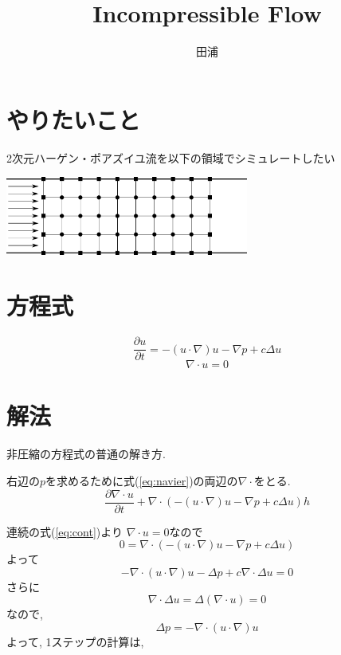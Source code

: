\documentclass[12pt,dvipdfmx]{article}
\title{Incompressible Flow}
\author{田浦}
\date{}
\begin{document}
\maketitle

\section{やりたいこと}
2次元ハーゲン・ポアズイユ流を以下の領域でシミュレートしたい

\begin{center}
\includegraphics[width=0.6\textwidth]{out/pdf/svg/flow.pdf}
\end{center}

\section{方程式}

\begin{equation}
  \frac{\partial u}{\partial t}
  = - (u \cdot \nabla) u - \nabla p + c \Delta u
  \label{eq:navier}
\end{equation}
\begin{equation}
  \nabla \cdot u = 0
  \label{eq:cont}
\end{equation}

\section{解法}
非圧縮の方程式の普通の解き方.

右辺の$p$を求めるために式(\ref{eq:navier})の両辺の$\nabla \cdot$をとる.
\begin{equation}
\frac{\partial \nabla\cdot u}{\partial t}
  + \nabla \cdot (- (u \cdot \nabla) u - \nabla p + c \Delta u) h
\end{equation}

連続の式(\ref{eq:cont})より
$\nabla \cdot u = 0$なので
\begin{equation}
  0 = \nabla \cdot (- (u \cdot \nabla) u - \nabla p + c \Delta u)
\end{equation}
よって
\begin{equation}
  - \nabla \cdot (u \cdot \nabla) u - \Delta p + c \nabla \cdot \Delta u = 0
\end{equation}
さらに
\begin{equation}
\nabla \cdot \Delta u = \Delta (\nabla \cdot u) = 0
\end{equation}
なので,
\begin{equation}
  \Delta p = - \nabla \cdot (u \cdot \nabla) u
  \label{eq:poisson}
\end{equation}
よって, 1ステップの計算は,
\end{document}
